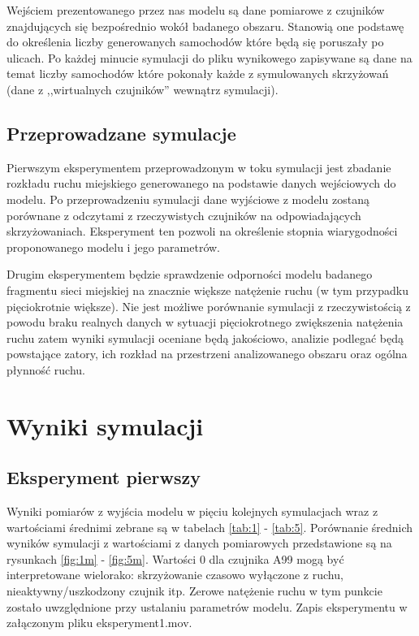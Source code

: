 \documentclass[a4paper,12pt]{article}
\begin{document}
Wejściem prezentowanego przez nas modelu są dane pomiarowe z czujników znajdujących się bezpośrednio wokół badanego obszaru. Stanowią one podstawę do określenia liczby generowanych samochodów które będą się poruszały po ulicach. Po każdej minucie symulacji do pliku wynikowego zapisywane są dane na temat liczby samochodów które pokonały każde z symulowanych skrzyżowań (dane z ,,wirtualnych czujników'' wewnątrz symulacji). 

\subsection*{Przeprowadzane symulacje}
Pierwszym eksperymentem przeprowadzonym w toku symulacji jest zbadanie rozkładu ruchu miejskiego generowanego na podstawie danych wejściowych do modelu. Po przeprowadzeniu symulacji dane wyjściowe z modelu zostaną porównane z odczytami z rzeczywistych czujników na odpowiadających skrzyżowaniach. Eksperyment ten pozwoli na określenie stopnia wiarygodności proponowanego modelu i jego parametrów. 

Drugim eksperymentem będzie sprawdzenie odporności modelu badanego fragmentu sieci miejskiej na znacznie większe natężenie ruchu (w tym przypadku pięciokrotnie większe). Nie jest możliwe porównanie symulacji z rzeczywistością z powodu braku realnych danych w sytuacji pięciokrotnego zwiększenia natężenia ruchu zatem wyniki symulacji oceniane będą jakościowo, analizie podlegać będą powstające zatory, ich rozkład na przestrzeni analizowanego obszaru oraz ogólna płynność ruchu.

\newpage
\section{Wyniki symulacji}
\subsection*{Eksperyment pierwszy}
Wyniki pomiarów z wyjścia modelu w pięciu kolejnych symulacjach wraz z wartościami średnimi zebrane są w tabelach \ref{tab:1} - \ref{tab:5}. Porównanie średnich wyników symulacji z wartościami z danych pomiarowych przedstawione są na rysunkach \ref{fig:1m} - \ref{fig:5m}. Wartości 0 dla czujnika A99 mogą być interpretowane wielorako: skrzyżowanie czasowo wyłączone z ruchu, nieaktywny/uszkodzony czujnik itp. Zerowe natężenie ruchu w tym punkcie zostało uwzględnione przy ustalaniu parametrów modelu. Zapis eksperymentu w załączonym pliku eksperyment1.mov.
\end{document}
